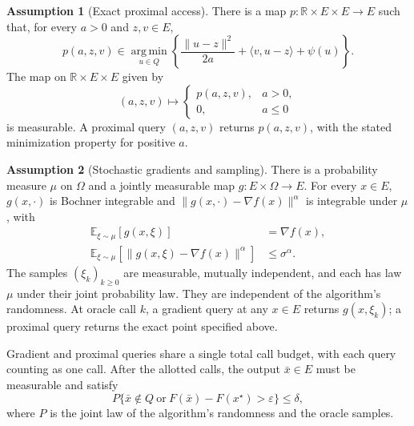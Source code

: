 \documentclass[10pt]{article}
\theoremstyle{definition}
\newtheorem{assumption}{Assumption}
\begin{document}
\begin{assumption}[Exact proximal access]
There is a map $p:\mathbb{R}\times E\times E\to E$ such that, for every $a>0$ and $z,v\in E$,
\[
p(a,z,v)\in\operatorname*{arg\,min}_{u\in Q}
\left\{\frac{\|u-z\|^2}{2a}
+\langle v,u-z\rangle+\psi(u)\right\}.
\]
The map on $\mathbb{R}\times E\times E$ given by
\[
(a,z,v)\longmapsto
\begin{cases}
p(a,z,v),&a>0,\\
0,&a\leq0
\end{cases}
\]
is measurable. A proximal query $(a,z,v)$ returns $p(a,z,v)$, with the stated minimization property for positive $a$.
\end{assumption}

\begin{assumption}[Stochastic gradients and sampling]
There is a probability measure $\mu$ on $\Omega$ and a jointly measurable map $g:E\times\Omega\to E$. For every $x\in E$, $g(x,\cdot)$ is Bochner integrable and $\|g(x,\cdot)-\nabla f(x)\|^\alpha$ is integrable under $\mu$, with
\[
\begin{aligned}
\mathbb{E}_{\xi\sim\mu}[g(x,\xi)]&=\nabla f(x),\\
\mathbb{E}_{\xi\sim\mu}
[\|g(x,\xi)-\nabla f(x)\|^\alpha]&\leq\sigma^\alpha.
\end{aligned}
\]
The samples $(\xi_k)_{k\geq0}$ are measurable, mutually independent, and each has law $\mu$ under their joint probability law. They are independent of the algorithm's randomness. At oracle call $k$, a gradient query at any $x\in E$ returns $g(x,\xi_k)$; a proximal query returns the exact point specified above.
\end{assumption}

Gradient and proximal queries share a single total call budget, with each query counting as one call. After the allotted calls, the output $\bar{x}\in E$ must be measurable and satisfy
\[
P\bigl\{\bar{x}\notin Q\ \text{or}\ F(\bar{x})-F(x^\star)>\varepsilon\bigr\}
\leq\delta,
\]
where $P$ is the joint law of the algorithm's randomness and the oracle samples.
\end{document}
